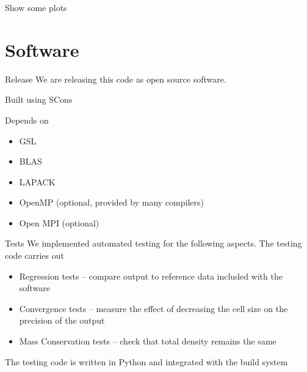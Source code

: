 \documentclass{beamer}
\begin{document}
    \begin{frame}
        Show some plots
    \end{frame}

\section{Software}
    \begin{frame}{Release}
        We are releasing this code as open source software.

        \vfill

        Built using SCons

        \vfill

        Depends on
        \begin{itemize}
            \item GSL
            \item BLAS
            \item LAPACK
            \item OpenMP (optional, provided by many compilers)
            \item Open MPI (optional)
        \end{itemize}
    \end{frame}

    \begin{frame}{Tests}
        We implemented automated testing for the following aspects. The testing code carries out
        \begin{itemize}
            \item Regression tests -- compare output to reference data included with the software
            \item Convergence tests -- measure the effect of decreasing the cell size on the precision of the output
            \item Mass Conservation tests -- check that total density remains the same
        \end{itemize}

        \vfill

        The testing code is written in Python and integrated with the build system
    \end{frame}
\end{document}
